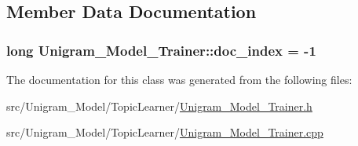 \subsection{Member Data Documentation}
\hypertarget{class_unigram___model___trainer_abc69c53a2021d6af93b4ccca6ee26c6c}{
\subsubsection[{doc\_\-index}]{\setlength{\rightskip}{0pt plus 5cm}long {\bf Unigram\_\-Model\_\-Trainer::doc\_\-index} = -\/1}}
\label{class_unigram___model___trainer_abc69c53a2021d6af93b4ccca6ee26c6c}


The documentation for this class was generated from the following files:\begin{DoxyCompactItemize}
\item 
src/Unigram\_\-Model/TopicLearner/\hyperlink{_unigram___model___trainer_8h}{Unigram\_\-Model\_\-Trainer.h}\item 
src/Unigram\_\-Model/TopicLearner/\hyperlink{_unigram___model___trainer_8cpp}{Unigram\_\-Model\_\-Trainer.cpp}\end{DoxyCompactItemize}
